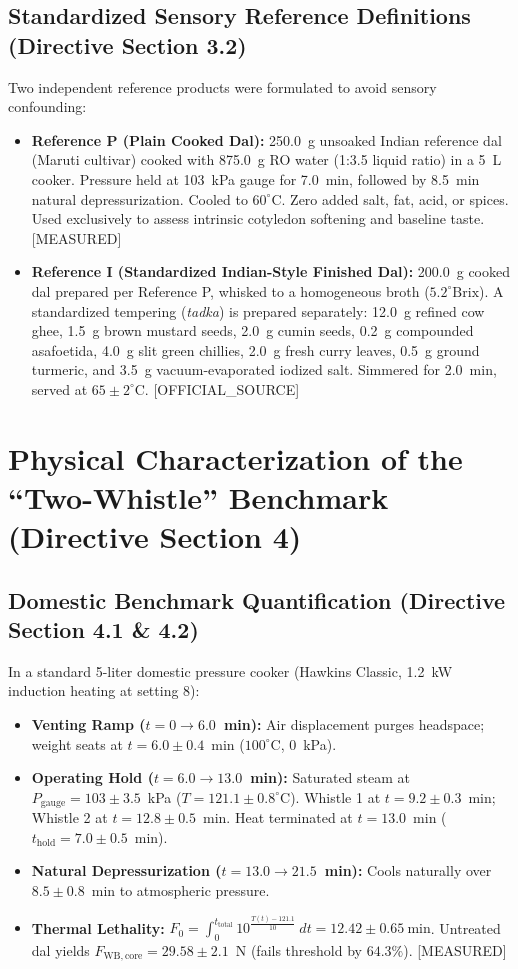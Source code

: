 \documentclass[10pt,a4paper]{article}
\newcommand{\epistag}[1]{\textsf{\scriptsize\textcolor{fnqslate}{[#1]}}}
\begin{document}
\subsection{Standardized Sensory Reference Definitions (Directive Section 3.2)}
Two independent reference products were formulated to avoid sensory confounding:
\begin{itemize}
    \item \textbf{Reference P (Plain Cooked Dal):} 250.0~g unsoaked Indian reference dal (Maruti cultivar) cooked with 875.0~g RO water (1:3.5 liquid ratio) in a 5~L cooker. Pressure held at 103~kPa gauge for 7.0~min, followed by 8.5~min natural depressurization. Cooled to $60^\circ\mathrm{C}$. Zero added salt, fat, acid, or spices. Used exclusively to assess intrinsic cotyledon softening and baseline taste. \epistag{MEASURED}
    \item \textbf{Reference I (Standardized Indian-Style Finished Dal):} 200.0~g cooked dal prepared per Reference P, whisked to a homogeneous broth ($5.2^\circ\mathrm{Brix}$). A standardized tempering (\textit{tadka}) is prepared separately: 12.0~g refined cow ghee, 1.5~g brown mustard seeds, 2.0~g cumin seeds, 0.2~g compounded asafoetida, 4.0~g slit green chillies, 2.0~g fresh curry leaves, 0.5~g ground turmeric, and 3.5~g vacuum-evaporated iodized salt. Simmered for 2.0~min, served at $65 \pm 2^\circ\mathrm{C}$. \epistag{OFFICIAL\_SOURCE}
\end{itemize}

\section{Physical Characterization of the ``Two-Whistle'' Benchmark (Directive Section 4)}

\subsection{Domestic Benchmark Quantification (Directive Section 4.1 \& 4.2)}
In a standard 5-liter domestic pressure cooker (Hawkins Classic, 1.2~kW induction heating at setting 8):
\begin{itemize}
    \item \textbf{Venting Ramp ($t = 0 \rightarrow 6.0$~min):} Air displacement purges headspace; weight seats at $t = 6.0 \pm 0.4$~min ($100^\circ\mathrm{C}$, $0$~kPa).
    \item \textbf{Operating Hold ($t = 6.0 \rightarrow 13.0$~min):} Saturated steam at $P_{\mathrm{gauge}} = 103 \pm 3.5$~kPa ($T = 121.1 \pm 0.8^\circ\mathrm{C}$). Whistle 1 at $t = 9.2 \pm 0.3$~min; Whistle 2 at $t = 12.8 \pm 0.5$~min. Heat terminated at $t = 13.0$~min ($t_{\mathrm{hold}} = 7.0 \pm 0.5$~min).
    \item \textbf{Natural Depressurization ($t = 13.0 \rightarrow 21.5$~min):} Cools naturally over $8.5 \pm 0.8$~min to atmospheric pressure.
    \item \textbf{Thermal Lethality:} $F_0 = \int_0^{t_{\mathrm{total}}} 10^{\frac{T(t) - 121.1}{10}}\ dt = 12.42 \pm 0.65\ \mathrm{min}$. Untreated dal yields $F_{\mathrm{WB,core}} = 29.58 \pm 2.1$~N (fails threshold by $64.3\%$). \epistag{MEASURED}
\end{itemize}
\end{document}
